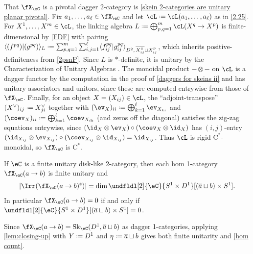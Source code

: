 \documentclass[12pt,reqno]{amsart}
\newcommand{\Sk}{\mathrm{Sk}}
\newcommand{\C}{\eC}
\newcommand{\fcj}[1]{\overline{#1}}
\newcommand{\bkt}[2]{\langle #1|#2 \rangle}
\newcommand{\Cstar}{\ensuremath{\mathrm{C}^{*}}}
\newcommand{\cent}{\textup{\textcent}}
\renewcommand{\amalg}{\sqcup}
\DeclareRobustCommand{\coloneq}{\mathrel{\vcenter{\baselineskip0.5ex\lineskiplimit0pt\hbox{\scriptsize{\upshape.}}\hbox{\scriptsize{\upshape.}}}}=}
\begin{document}
\begin{pf}
That $\fX_\C$ is a pivotal dagger 2-category is \cref{skein 2-categories are unitary planar pivotal}. 
Fix $a_1,\dots,a_\ell\in\fX_\C$ and let $\cL\coloneq\cL(a_1,\dots,a_\ell)$ as in \cref{2.25}. For $X^1,\dots,X^m\in\cL$, the linking algebra $L\coloneq\bigoplus_{p,q=1}^m\cL(X^q\to X^p)$ is finite-dimensional by \ref{FDF} with pairing $\bkt{(f^{pq})}{(g^{pq})}_L\coloneq\sum_{p,q=1}^m\sum_{i,j=1}^\ell\bkt{f^{pq}_{ij}}{g^{pq}_{ij}}_{D^2,\,\fcj{X^q_{ij}}\cup X^p_{ij}}$, which inherits positive-definiteness from \ref{2psnP}. Since $L$ is $*$-definite, it is unitary by the Characterization of Unitary Algebras \cite[Thm. I.2.4.4]{UQSL}. The monoidal product $-\otimes-$ on $\cL$ is a dagger functor by the computation in the proof of \cref{daggers for skeins ii} and has unitary associators and unitors, since these are computed entrywise from those of $\fX_\C$. Finally, for an object $X=(X_{ij})\in\cL$, the ``adjoint-transpose'' $(X^\vee)_{ij}\coloneq X_{ji}^\vee$ together with $(\ev_X)_{ii}\coloneq\bigoplus_{k=1}^\ell\ev_{X_{ki}}$ and $(\coev_X)_{ii}\coloneq\bigoplus_{k=1}^\ell\coev_{X_{ik}}$ (and zeros off the diagonal) satisfies the zig-zag equations entrywise, since $(\id_X\otimes\ev_X)\circ(\coev_X\otimes\id_X)$ has $(i,j)$-entry $(\id_{X_{ij}}\otimes\ev_{X_{ij}})\circ(\coev_{X_{ij}}\otimes\id_{X_{ij}})=\id_{X_{ij}}$. Thus $\cL$ is rigid $\Cstar$-monoidal, so $\fX_\C$ is $\Cstar$. 
\end{pf}


\begin{lemma}
  \label{hom 1-categories are finite unitary}
  If $\C$ is a finite unitary disk-like 2-category, then each hom 1-category $\fX_\C(a\to b)$ is finite unitary and
  \begin{equation}
    \label{hom count}
    |\Irr(\fX_\C(a\to b)^\cent)|
    =
    \dim\undfldl[2]{\C}{S^1\times D^1}[(\fcj a\amalg b)\times S^1].
  \end{equation}
  In particular $\fX_\C(a\to b)=0$ if and only if $\undfldl[2]{\C}{S^1\times D^1}[(\fcj a\amalg b)\times S^1]=0$.
\end{lemma}

\begin{pf}
  Since $\fX_\C(a\to b)=\Sk_\C(D^1,\fcj a\amalg b)$ as dagger 1-categories, applying \cref{lem:closing-up} with $Y\coloneq D^1$ and $\eta\coloneq\fcj a\amalg b$ gives both finite unitarity and \eqref{hom count}.
\end{pf}
\end{document}
